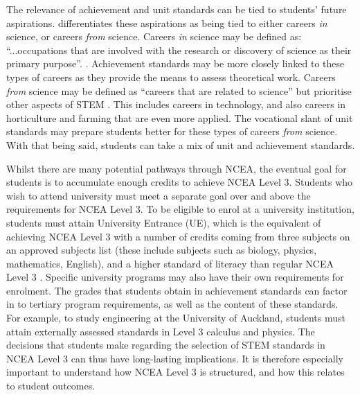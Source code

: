 \documentclass[a4paper]{article}
\begin{document}
The relevance of achievement and unit standards can be tied to students' future aspirations. \cite[p.20]{wong2016science} differentiates these aspirations as being tied to either careers \textit{in} science, or careers \textit{from} science. Careers \textit{in} science may be defined as: ``...occupations that are involved with the research or discovery of science as their primary purpose''.  \cite[p.20]{wong2016science}. Achievement standards may be more closely linked to these types of careers as they provide the means to assess theoretical work. Careers \textit{from} science may be defined as ``careers that are related to science'' but prioritise other aspects of STEM  \cite[p.20]{wong2016science}. This includes careers in technology, and also careers in horticulture and farming that are even more applied. The vocational slant of unit standards may prepare students better for these types of careers \textit{from} science. With that being said, students can take a mix of unit and achievement standards.

Whilst there are many potential pathways through NCEA, the eventual goal for students is to accumulate enough credits to achieve NCEA Level 3. Students who wish to attend university must meet a separate goal over and above the requirements for NCEA Level 3. To be eligible to enrol at a university institution, students must attain University Entrance (UE), which is the equivalent of achieving NCEA Level 3 with a number of credits coming from three subjects on an approved subjects list (these include subjects such as biology, physics, mathematics, English), and a higher standard of literacy than regular NCEA Level 3 \cite{hipkins2016ncea}. Specific university programs may also have their own requirements for enrolment. The grades that students obtain in achievement standards can factor in to tertiary program requirements, as well as the content of these standards. For example, to study engineering at the University of Auckland, students must attain externally assessed standards in Level 3 calculus and physics. The decisions that students make regarding the selection of STEM standards in NCEA Level 3 can thus have long-lasting implications. It is therefore especially important to understand how NCEA Level 3 is structured, and how this relates to student outcomes.  
\end{document}
